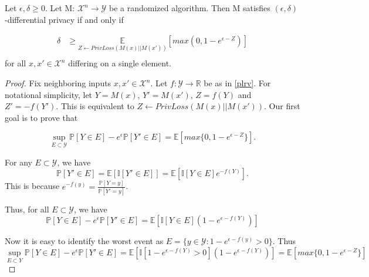 \documentclass{article}
\begin{document}
\begin{lemma}
\label{delta-bound}
\cite{CKS20} Let $\epsilon, \delta \geq 0$. Let M: $\mathcal{X}^n \rightarrow \mathcal{Y}$ be a randomized algorithm. Then M satisfies $(\epsilon, \delta)$-differential privacy if and only if

\begin{align}
    \delta &\geq \underset{Z \leftarrow PrivLoss(M(x)|| M(x'))}{\mathbb{E}} [max(0, 1 - e^{\epsilon - Z})] \\
\end{align}
for all $x, x' \in \mathcal{X}^n$ differing on a single element.

\begin{proof}
Fix neighboring inputs $x, x' \in \mathcal{X}^n$. 
Let $f: \mathcal{Y} \rightarrow \mathbb{R}$ be as in \ref{plrv}.
For notational simplicity, let $Y = M(x)$, $Y' = M(x')$, $Z = f(Y)$ and $Z' = -f(Y')$.
This is equivalent to $Z \leftarrow PrivLoss(M(x) || M(x'))$.
Our first goal is to prove that

\begin{equation}
    \sup\limits_{E \subset \mathcal{Y}} \mathbb{P}[Y \in E] - e^\epsilon \mathbb{P}[Y' \in E] = \mathbb{E}[max\{0, 1 - e^{\epsilon - Z}\}].
\end{equation}

For any $E \subset \mathcal{Y}$, we have
\begin{equation}
    \mathbb{P}[Y' \in E] = \mathbb{E}[\mathbb{I}[Y' \in E]] = \mathbb{E}[\mathbb{I}[Y \in E] e^{-f(Y)}].
\end{equation}
This is because $e^{-f(y)} = \frac{\mathbb{P}[Y=y]}{\mathbb{P}[Y'=y]}$.

Thus, for all $E \subset \mathcal{Y}$, we have 
\begin{equation}
    \mathbb{P}[Y \in E] - e^\epsilon \mathbb{P}[Y' \in E] = \mathbb{E} \left[ \mathbb{I}[Y \in E] (1 - e^{\epsilon - f(Y)}) \right]
\end{equation}

Now it is easy to identify the worst event as $E = \{y \in \mathcal{Y} : 1 - e^{\epsilon - f(y)} > 0\}$. Thus
\begin{equation}
    \sup\limits_{E \subset Y} \mathbb{P}[Y \in E] - e^{\epsilon} \mathbb{P}[Y' \in E] = \mathbb{E} \left[ \mathbb{I}[1 - e^{\epsilon - f(Y)} > 0] (1 - e^{\epsilon - f(Y)}) \right] = \mathbb{E}[max\{ 0, 1 - e^{\epsilon - Z} \}]
\end{equation}


\end{proof}
\end{lemma}
\end{document}
